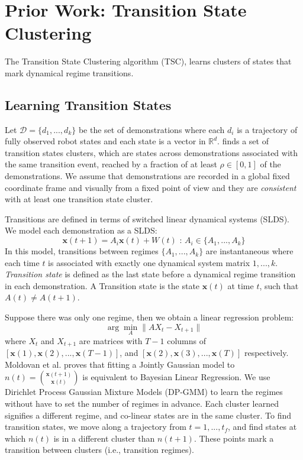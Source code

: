 \documentclass[0-main.tex]{subfiles}
\begin{document}
\section{Prior Work: Transition State Clustering}
\label{sec:tsc}

The Transition State Clustering algorithm (TSC), learns clusters of states that mark dynamical regime transitions.

\subsection{Learning Transition States}
Let $\mathcal{D}=\{d_1,...,d_k\}$ be the set of demonstrations where each $d_i$ is a trajectory of fully observed robot states and each state is a vector in $\mathbb{R}^d$.
\tsc finds a set of transition states clusters, which are states across demonstrations associated with the same transition event, reached by a fraction of at least $\rho \in [0,1]$ of the demonstrations.
We assume that demonstrations are recorded in a global fixed coordinate frame and visually from a fixed point of view and they are \emph{consistent} with at least one transition state cluster.

Transitions are defined in terms of switched linear dynamical systems (SLDS).
We model each demonstration as a SLDS:
\vspace{-3pt}
\[
\mathbf{x}(t+1) = A_{i}\mathbf{x}(t) + W(t) \text{ : } A_i \in \{A_1,...,A_k\}
\]
In this model, transitions between regimes $\{A_1,...,A_k\}$ are instantaneous where each time $t$ is associated with exactly one dynamical system matrix $1,...,k$. \emph{Transition state} is defined as the last state before a dynamical regime transition in each demonstration. A Transition state is the state $\mathbf{x}(t)$ at time $t$, such that $A(t) \ne A(t+1)$.

Suppose there was only one regime, then we obtain a linear regression problem:
\vspace{-3pt}
\[
\arg\min_A \|A X_t - X_{t+1}\|
\]
where $X_t$ and $X_{t+1}$ are matrices with $T-1$ columns of $[\mathbf{x}(1),\mathbf{x}(2),...,\mathbf{x}(T-1)]$, and $[\mathbf{x}(2),\mathbf{x}(3),...,\mathbf{x}(T)]$ respectively.
Moldovan et al. \cite{moldovan2013dirichlet} proves that fitting a Jointly Gaussian model to $n(t) = \binom{\mathbf{x}(t+1)}{\mathbf{x}(t)}$ is equivalent to Bayesian Linear Regression.
We use Dirichlet Process Gaussian Mixture Models (DP-GMM) to learn the regimes without have to set the number of regimes in advance.
Each cluster learned signifies a different regime, and co-linear states are in the same cluster.
To find transition states, we move along a trajectory from $t=1,...,t_f$, and find states at which $n(t)$ is in a different cluster than $n(t+1)$.
These points mark a transition between clusters (i.e., transition regimes).
\end{document}
